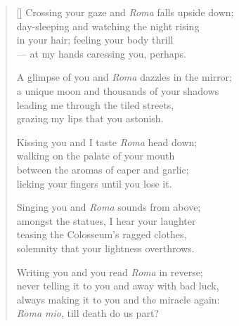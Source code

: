 \documentclass[a4paper,11pt]{article}
\begin{document}
\thispagestyle{empty}


\settowidth{\versewidth}{always making it to you and the miracle again,}

\bigskip

\begin{verse}[\versewidth]
  Crossing your gaze and \emph{Roma} falls upside down; \\
  day-sleeping and watching the night rising \\
  in your hair; feeling your body thrill \\
  --- at my hands caressing you, perhaps.

  A glimpse of you and \emph{Roma} dazzles in the mirror; \\
  a unique moon and thousands of your shadows \\
  leading me through the tiled streets, \\
  grazing my lips that you astonish.

  Kissing you and I taste \emph{Roma} head down; \\
  walking on the palate of your mouth \\
  between the aromas of caper and garlic; \\
  licking your fingers until you lose it.

  Singing you and \emph{Roma} sounds from above; \\
  amongst the statues, I hear your laughter \\
  teasing the Colosseum's ragged clothes, \\
  solemnity that your lightness overthrows.

  Writing you and you read \emph{Roma} in reverse; \\
  never telling it to you and away with bad luck, \\
  always making it to you and the miracle again: \\
  \emph{Roma mio}, till death do us part?
\end{verse}
\end{document}
